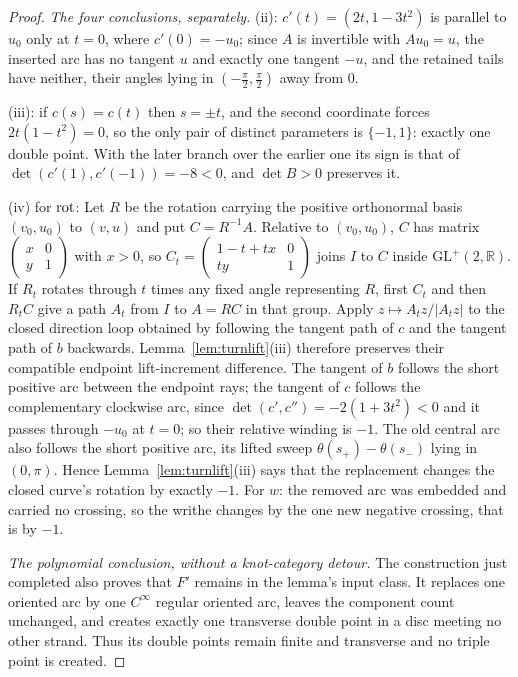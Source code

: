 \begin{proof}
\emph{The four conclusions, separately.} (ii): $c'(t)=(2t,1-3t^2)$ is parallel to
$u_0$ only at $t=0$, where $c'(0)=-u_0$; since $A$ is invertible with
$Au_0=u$, the inserted arc has no tangent $u$ and exactly one tangent $-u$, and
the retained tails have neither, their angles lying in $(-\tfrac\pi2,\tfrac\pi2)$
away from $0$.

(iii): if $c(s)=c(t)$ then $s=\pm t$, and the second coordinate forces
$2t(1-t^2)=0$, so the only pair of distinct parameters is $\{-1,1\}$: exactly
one double point. With the later branch over the earlier one its sign is that of
$\det(c'(1),c'(-1))=-8<0$, and $\det B>0$ preserves it.

(iv) for $\operatorname{rot}$: Let $R$ be the rotation carrying the positive orthonormal basis
$(v_0,u_0)$ to $(v,u)$ and put $C=R^{-1}A$. Relative to $(v_0,u_0)$,
$C$ has matrix
$\left(\begin{smallmatrix}x&0\\y&1\end{smallmatrix}\right)$ with $x>0$, so
$C_t=\left(\begin{smallmatrix}1-t+tx&0\\ty&1\end{smallmatrix}\right)$
joins $I$ to $C$ inside $\mathrm{GL}^+(2,\mathbb R)$. If $R_t$ rotates
through $t$ times any fixed angle representing $R$, first $C_t$ and then
$R_tC$ give a path $A_t$ from $I$ to $A=RC$ in that group. Apply
$z\mapsto A_tz/|A_tz|$ to the closed direction loop obtained by following
the tangent path of $c$ and the tangent path of $b$ backwards.
Lemma~\ref{lem:turnlift}(iii) therefore preserves their compatible endpoint
lift-increment difference. The tangent of $b$ follows the short positive arc between the
endpoint rays; the tangent of $c$ follows the complementary clockwise arc, since
$\det(c',c'')=-2(1+3t^2)<0$ and it passes through $-u_0$ at $t=0$; so their
relative winding is $-1$. The old central arc also follows the short positive
arc, its lifted sweep $\theta(s_+)-\theta(s_-)$ lying in $(0,\pi)$. Hence Lemma~\ref{lem:turnlift}(iii) says that the replacement changes the
closed curve's rotation by exactly $-1$. For
$w$: the removed arc was embedded and carried no crossing, so the writhe changes
by the one new negative crossing, that is by $-1$.

\emph{The polynomial conclusion, without a knot-category detour.}
The construction just completed also proves that $F'$ remains in the lemma's
input class.  It replaces one oriented arc by one $C^\infty$ regular oriented
arc, leaves the component count unchanged, and creates exactly one transverse
double point in a disc meeting no other strand.  Thus its double points remain
finite and transverse and no triple point is created.


\end{proof}
